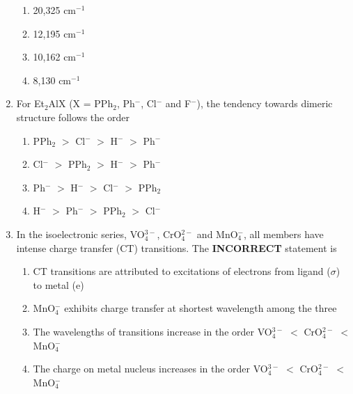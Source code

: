 \documentclass[journal,12pt,onecolumn]{IEEEtran}
\theoremstyle{remark}
\begin{document}
\begin{enumerate}
\begin{multicols}{2}
\begin{enumerate}
    \item 20,325 cm$^{-1}$
    \item 12,195 cm$^{-1}$
    \item 10,162 cm$^{-1}$
    \item 8,130 cm$^{-1}$
\end{enumerate}
\end{multicols}
 

\item    \hspace{0.5cm} For Et$_2$AlX (X = PPh$_2$, Ph$^-$, Cl$^-$ and F$^-$), the tendency towards dimeric structure follows the order  \hfill{}

\begin{multicols}{2}
\begin{enumerate}
    \item PPh$_2$ $>$ Cl$^-$ $>$ H$^-$ $>$ Ph$^-$
    \item Cl$^-$ $>$ PPh$_2$ $>$ H$^-$ $>$ Ph$^-$
    \item Ph$^-$ $>$ H$^-$ $>$ Cl$^-$ $>$ PPh$_2$
    \item H$^-$ $>$ Ph$^-$ $>$ PPh$_2$ $>$ Cl$^-$
\end{enumerate}
\end{multicols}
 

\item    \hspace{0.5 cm} In the isoelectronic series, VO$_4^{3-}$, CrO$_4^{2-}$ and MnO$_4^-$, all members have intense charge transfer (CT) transitions. The \textbf{INCORRECT} statement is  \hfill{}

\begin{multicols}{2}
\begin{enumerate}
    \item CT transitions are attributed to excitations of electrons from ligand ($\sigma$) to metal (e)
    \item MnO$_4^-$ exhibits charge transfer at shortest wavelength among the three
    \item The wavelengths of transitions increase in the order VO$_4^{3-}$ $<$ CrO$_4^{2-}$ $<$ MnO$_4^-$
    \item The charge on metal nucleus increases in the order VO$_4^{3-}$ $<$ CrO$_4^{2-}$ $<$ MnO$_4^-$
\end{enumerate}
\end{multicols}
 


\end{enumerate}
\end{document}
